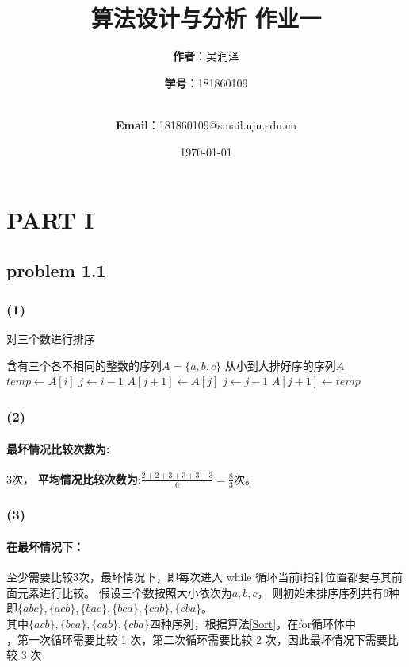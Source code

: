 \documentclass[11pt]{ctexart}
\title{\Huge\textbf{算法设计与分析 作业一}\\}
\author{\Large\textbf{作者}：吴润泽 \and{\Large\textbf{学号}：181860109}\\
	\\
	\and {\Large\textbf{Email}：181860109@smail.nju.edu.cn}\\}
\date{\Large\today}
\begin{document}
	\maketitle
	\newpage
	\tableofcontents
	
	\section*{PART I}
	\subsection*{problem 1.1}
	\subsubsection*{(1)}
	\begin{algorithm}
		\caption{对三个数进行排序}
		\label{Sort}
		\begin{algorithmic}[1]
			\Require 含有三个各不相同的整数的序列$A=\{a,b,c\}$
			\Ensure 从小到大排好序的序列$A$
			\State $temp \gets A[i]$
			\State $j \gets i-1$
			\State $A[j+1] \gets A[j]$
			\State $j \gets j-1$
			\EndWhile
			\State $A[j+1] \gets temp$
			\EndFor
			\EndFunction
		\end{algorithmic}
	\end{algorithm}
	
	\subsubsection*{(2)}	
	\paragraph{最坏情况比较次数为:}3次，
	\textbf{平均情况比较次数为}:{\Large$ \frac{2+2+3+3+3+3}{6}=\frac{8}{3}$}次。
	
	\subsubsection*{(3)}
	\paragraph{在最坏情况下：}至少需要比较3次，最坏情况下，即每次进入 while 循环当前i指针位置都要与其前面元素进行比较。
	假设三个数按照大小依次为$a,b,c$，
	则初始未排序序列共有6种即$\{abc\},\{acb\},\{bac\},\{bca\},\{cab\},\{cba\}$。\\
	其中$\{acb\},\{bca\},\{cab\},\{cba\}$四种序列，根据算法\ref{Sort}，在for循环体中\\
	，第一次循环需要比较 1 次，第二次循环需要比较 2 次，因此最坏情况下需要比较 3 次
\end{document}

